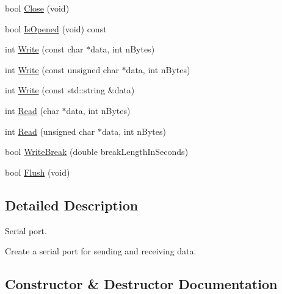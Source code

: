 \begin{DoxyCompactItemize}
\item 
bool \hyperlink{classosa_serial_port_a290aba37a1833f11db1f02f5dab2b83b}{Close} (void)
\item 
bool \hyperlink{classosa_serial_port_a64b3f4b9e6470e795b1d7f323484d449}{Is\+Opened} (void) const 
\item 
int \hyperlink{classosa_serial_port_a7baafbf6d506ca7c3af1532af2e0472d}{Write} (const char $\ast$data, int n\+Bytes)
\item 
int \hyperlink{classosa_serial_port_aaf39457bc6bea83a234488a66d340e6e}{Write} (const unsigned char $\ast$data, int n\+Bytes)
\item 
int \hyperlink{classosa_serial_port_ab40ce98451ba22f5dc4f1d606cf3e510}{Write} (const std\+::string \&data)
\item 
int \hyperlink{classosa_serial_port_ab3fb6c558b3f9cfea6100eb98f8caa19}{Read} (char $\ast$data, int n\+Bytes)
\item 
int \hyperlink{classosa_serial_port_af47e231e6051fcefd0b9a4ccf7709408}{Read} (unsigned char $\ast$data, int n\+Bytes)
\item 
bool \hyperlink{classosa_serial_port_ac9edbc73b59129c5c4600c9d4f414c7c}{Write\+Break} (double break\+Length\+In\+Seconds)
\item 
bool \hyperlink{classosa_serial_port_ae58e9417902641fa50bc5d21af33989e}{Flush} (void)
\end{DoxyCompactItemize}


\subsection{Detailed Description}
Serial port. 

Create a serial port for sending and receiving data. 

\subsection{Constructor \& Destructor Documentation}
\hypertarget{classosa_serial_port_aec2efe7da1b46d934f2fe588defa16ed}{}
